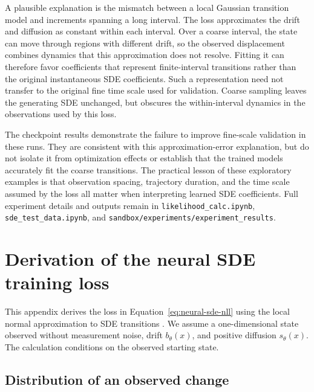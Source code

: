 A plausible explanation is the mismatch between a local Gaussian transition
model and increments spanning a long interval. The loss approximates the drift
and diffusion as constant within each interval. Over a coarse interval, the
state can move through regions with different drift, so the observed
displacement combines dynamics that this approximation does not resolve.
Fitting it can therefore favor coefficients that represent finite-interval
transitions rather than the original instantaneous SDE coefficients. Such a
representation need not transfer to the original fine time scale used for
validation. Coarse sampling leaves the generating SDE unchanged, but obscures
the within-interval dynamics in the observations used by this loss.

The checkpoint results demonstrate the failure to improve fine-scale
validation in these runs. They are consistent with this approximation-error
explanation, but do not isolate it from optimization effects or establish that
the trained models accurately fit the coarse transitions. The practical lesson
of these exploratory examples is that observation spacing, trajectory duration,
and the time scale assumed by the loss all matter when interpreting learned
SDE coefficients. Full experiment details and outputs remain in
\texttt{likelihood\_calc.ipynb}, \texttt{sde\_test\_data.ipynb}, and
\texttt{sandbox/experiments/experiment\_results}.

\clearpage

\section{Derivation of the neural SDE training loss}
\label{app:neural-sde-nll-derivation}

This appendix derives the loss in Equation~\eqref{eq:neural-sde-nll} using
the local normal approximation to SDE transitions
\parencite{SarkkaSolin2019}. We assume a one-dimensional state observed
without measurement noise, drift $b_\theta(x)$, and positive diffusion
$s_\theta(x)$. The calculation conditions on the observed starting state.

\subsection{Distribution of an observed change}

